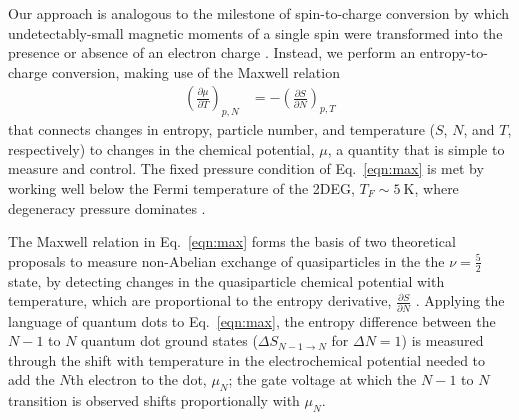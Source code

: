 \documentclass[twocolumn,showpacs,amsmath,amssymb,prl,aps,superscriptaddress]{revtex4-1}
\begin{document}
Our approach is analogous to the milestone of spin-to-charge conversion by which undetectably-small magnetic moments of a single spin were transformed into the presence or absence of an electron charge \cite{Elzerman2004, Ono2004}.  Instead, we perform an entropy-to-charge conversion, making use of the Maxwell relation
%
\begin{align}
\label{eqn:max}
        \left(\frac{\partial \mu}{\partial T}\right)_{p,N} &= -\left(\frac{\partial S}{\partial N}\right)_{p,T}
\end{align}
%
that connects changes in entropy, particle number, and temperature ($S$, $N$, and $T$, respectively) to changes in the chemical potential, $\mu$, a quantity that is simple to measure and control. The fixed pressure condition of Eq.~\ref{eqn:max} is met by working well below the Fermi temperature of the 2DEG, $T_F \sim \SI{5}{\kelvin}$, where degeneracy pressure dominates \cite{Landau1969}.

The Maxwell relation in Eq.~\ref{eqn:max} forms the basis of two theoretical proposals to measure non-Abelian exchange of quasiparticles in the the $\nu = \frac{5}{2}$ state, by detecting changes in the quasiparticle chemical potential with temperature, which are proportional to the entropy derivative, $\frac{\partial S}{\partial N}$ \cite{Cooper2009,Ben-Shach2013}.
Applying the language of quantum dots to Eq.~\ref{eqn:max}, the entropy difference between the $N-1$ to $N$ quantum dot ground states ($\Delta S_{N-1\rightarrow N}$ for $\Delta N=1$) is measured through the shift with temperature in the electrochemical potential needed to add the $N$th electron to the dot, $\mu_N$; the gate voltage at which the $N-1$ to $N$ transition is observed shifts proportionally with $\mu_{N}$.
\end{document}

